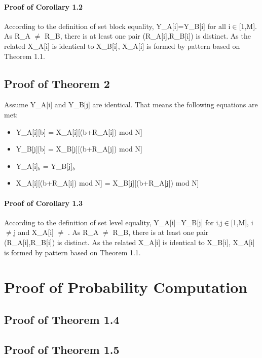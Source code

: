 \documentclass{article}
\begin{document}
\paragraph{Proof of Corollary 1.2}
According to the definition of set block equality, Y\_A[i]=Y\_B[i] for all i$\in$[1,M]. As R\_A $\neq$ R\_B, there is at least one pair (R\_A[i],R\_B[i]) is distinct. As the related X\_A[i] is identical to X\_B[i], X\_A[i] is formed by pattern based on Theorem 1.1.

\subsection{Proof of Theorem 2}
Assume Y\_A[i] and Y\_B[j] are identical.  That means the following equations are met:
\begin{itemize}
	\item Y\_A[i][b] = X\_A[i][(b+R\_A[i]) mod N] 
	\item Y\_B[j][b] = X\_B[j][(b+R\_A[j]) mod N]
	\item Y\_A[i]$_b$ = Y\_B[j]$_b$  
	\item X\_A[i][(b+R\_A[i]) mod N] = X\_B[j][(b+R\_A[j]) mod N]    
\end{itemize} 


\paragraph{Proof of Corollary 1.3}
According to the definition of set level equality, Y\_A[i]=Y\_B[j] for i,j$\in$[1,M], i$\neq$j and X\_A[i] $\neq$ . As R\_A $\neq$ R\_B, there is at least one pair (R\_A[i],R\_B[i]) is distinct. As the related X\_A[i] is identical to X\_B[i], X\_A[i] is formed by pattern based on Theorem 1.1.
\section{Proof of Probability Computation}
\subsection{Proof of Theorem 1.4}
\subsection{Proof of Theorem 1.5}
\end{document}
